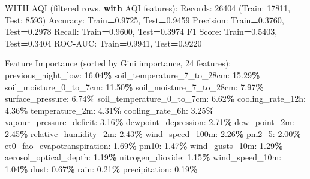 \documentclass[
  letterpaper,
  DIV=11,
  numbers=noendperiod]{scrartcl}
\newenvironment{Shaded}{\begin{snugshade}}{\end{snugshade}}
\newcommand{\BuiltInTok}[1]{#1}
\newcommand{\ControlFlowTok}[1]{\textcolor[rgb]{0.13,0.29,0.53}{\textbf{#1}}}
\newcommand{\DecValTok}[1]{\textcolor[rgb]{0.00,0.00,0.81}{#1}}
\newcommand{\FloatTok}[1]{\textcolor[rgb]{0.00,0.00,0.81}{#1}}
\newcommand{\NormalTok}[1]{#1}
\newcommand{\OperatorTok}[1]{\textcolor[rgb]{0.81,0.36,0.00}{\textbf{#1}}}
\begin{document}
\begin{Shaded}
\begin{Highlighting}[]
\NormalTok{WITH AQI (filtered rows, }\ControlFlowTok{with}\NormalTok{ AQI features):}
\NormalTok{  Records: }\DecValTok{26404}\NormalTok{ (Train: }\DecValTok{17811}\NormalTok{, Test: }\DecValTok{8593}\NormalTok{)}
\NormalTok{  Accuracy: Train}\OperatorTok{=}\FloatTok{0.9725}\NormalTok{, Test}\OperatorTok{=}\FloatTok{0.9459}
\NormalTok{  Precision: Train}\OperatorTok{=}\FloatTok{0.3760}\NormalTok{, Test}\OperatorTok{=}\FloatTok{0.2978}
\NormalTok{  Recall: Train}\OperatorTok{=}\FloatTok{0.9600}\NormalTok{, Test}\OperatorTok{=}\FloatTok{0.3974}
\NormalTok{  F1 Score: Train}\OperatorTok{=}\FloatTok{0.5403}\NormalTok{, Test}\OperatorTok{=}\FloatTok{0.3404}
\NormalTok{  ROC}\OperatorTok{{-}}\NormalTok{AUC: Train}\OperatorTok{=}\FloatTok{0.9941}\NormalTok{, Test}\OperatorTok{=}\FloatTok{0.9220}

\NormalTok{  Feature Importance (}\BuiltInTok{sorted}\NormalTok{ by Gini importance, }\DecValTok{24}\NormalTok{ features):}
\NormalTok{    previous\_night\_low: }\FloatTok{16.04}\OperatorTok{\%}
\NormalTok{    soil\_temperature\_7\_to\_28cm: }\FloatTok{15.29}\OperatorTok{\%}
\NormalTok{    soil\_moisture\_0\_to\_7cm: }\FloatTok{11.50}\OperatorTok{\%}
\NormalTok{    soil\_moisture\_7\_to\_28cm: }\FloatTok{7.97}\OperatorTok{\%}
\NormalTok{    surface\_pressure: }\FloatTok{6.74}\OperatorTok{\%}
\NormalTok{    soil\_temperature\_0\_to\_7cm: }\FloatTok{6.62}\OperatorTok{\%}
\NormalTok{    cooling\_rate\_12h: }\FloatTok{4.36}\OperatorTok{\%}
\NormalTok{    temperature\_2m: }\FloatTok{4.31}\OperatorTok{\%}
\NormalTok{    cooling\_rate\_6h: }\FloatTok{3.25}\OperatorTok{\%}
\NormalTok{    vapour\_pressure\_deficit: }\FloatTok{3.16}\OperatorTok{\%}
\NormalTok{    dewpoint\_depression: }\FloatTok{2.71}\OperatorTok{\%}
\NormalTok{    dew\_point\_2m: }\FloatTok{2.45}\OperatorTok{\%}
\NormalTok{    relative\_humidity\_2m: }\FloatTok{2.43}\OperatorTok{\%}
\NormalTok{    wind\_speed\_100m: }\FloatTok{2.26}\OperatorTok{\%}
\NormalTok{    pm2\_5: }\FloatTok{2.00}\OperatorTok{\%}
\NormalTok{    et0\_fao\_evapotranspiration: }\FloatTok{1.69}\OperatorTok{\%}
\NormalTok{    pm10: }\FloatTok{1.47}\OperatorTok{\%}
\NormalTok{    wind\_gusts\_10m: }\FloatTok{1.29}\OperatorTok{\%}
\NormalTok{    aerosol\_optical\_depth: }\FloatTok{1.19}\OperatorTok{\%}
\NormalTok{    nitrogen\_dioxide: }\FloatTok{1.15}\OperatorTok{\%}
\NormalTok{    wind\_speed\_10m: }\FloatTok{1.04}\OperatorTok{\%}
\NormalTok{    dust: }\FloatTok{0.67}\OperatorTok{\%}
\NormalTok{    rain: }\FloatTok{0.21}\OperatorTok{\%}
\NormalTok{    precipitation: }\FloatTok{0.19}\OperatorTok{\%}


\end{Highlighting}
\end{Shaded}
\end{document}
